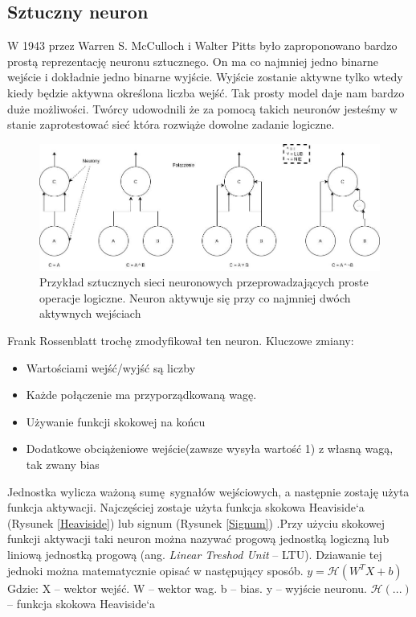 \documentclass{article}
\begin{document}
\subsection{Sztuczny neuron}
W 1943 przez Warren S. McCulloch i Walter Pitts było zaproponowano bardzo prostą reprezentację neuronu sztucznego. On ma co najmniej jedno binarne wejście i dokładnie jedno binarne wyjście. Wyjście zostanie aktywne tylko wtedy kiedy będzie aktywna określona liczba wejść. \cite{mcculloch1943logical} Tak prosty model daje nam bardzo duże możliwości. Twórcy udowodnili że za pomocą takich neuronów jesteśmy w stanie zaprotestować sieć która rozwiąże dowolne zadanie logiczne.

	
\begin{figure}[H]
	\centering
	\includegraphics[width=\textwidth,keepaspectratio=true]{SSN_simple_neurons}
	\caption{
		Przykład sztucznych sieci neuronowych przeprowadzających proste operacje logiczne. Neuron aktywuje się przy co najmniej dwóch aktywnych wejściach \cite{geron}
	}
\end{figure}

Frank Rossenblatt trochę zmodyfikował ten neuron.\newline
Kluczowe zmiany:
\begin{itemize}
	\item Wartościami wejść/wyjść są liczby
	\item Każde połączenie ma przyporządkowaną wagę.
	\item Używanie funkcji skokowej na końcu
	\item Dodatkowe obciążeniowe wejście(zawsze wysyła wartość 1) z własną wagą, tak zwany bias
\end{itemize}
Jednostka wylicza ważoną sumę sygnałów wejściowych, a następnie zostaję użyta funkcja aktywacji. Najczęściej zostaje użyta funkcja skokowa Heaviside`a (Rysunek \ref{Heaviside}) lub signum (Rysunek \ref{Signum}) .Przy użyciu skokowej funkcji aktywacji taki neuron można nazywać progową jednostką logiczną lub liniową jednostką progową (ang. \textit{Linear Treshod Unit} -- LTU). Dziawanie tej jednoki można matematycznie opisać w następujący sposób.\newline\newline
$ y = \mathcal{H}(W^{T}X + b) $\newline \newline
Gdzie: \newline
X -- wektor wejść. \newline
W -- wektor wag. \newline
b -- bias. \newline
y -- wyjście neuronu. \newline
$ \mathcal{H}(...) $ -- funkcja skokowa Heaviside`a\newline
\end{document}

